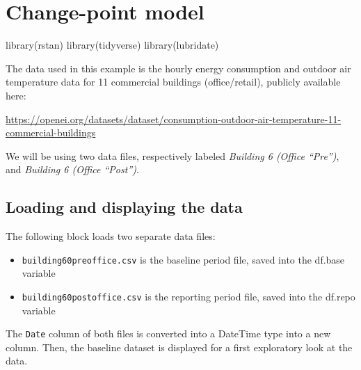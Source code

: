 \documentclass[
]{article}
\newenvironment{Shaded}{\begin{snugshade}}{\end{snugshade}}
\newcommand{\FunctionTok}[1]{\textcolor[rgb]{0.00,0.00,0.00}{#1}}
\newcommand{\NormalTok}[1]{#1}
\providecommand{\tightlist}{%
  \setlength{\itemsep}{0pt}\setlength{\parskip}{0pt}}
\begin{document}
\hypertarget{change-point-model}{%
\section{Change-point model}\label{change-point-model}}

\begin{Shaded}
\begin{Highlighting}[]
\FunctionTok{library}\NormalTok{(rstan)}
\FunctionTok{library}\NormalTok{(tidyverse)}
\FunctionTok{library}\NormalTok{(lubridate)}
\end{Highlighting}
\end{Shaded}

The data used in this example is the hourly energy consumption and outdoor air temperature data for 11 commercial buildings (office/retail), publicly available here:

\url{https://openei.org/datasets/dataset/consumption-outdoor-air-temperature-11-commercial-buildings}

We will be using two data files, respectively labeled \emph{Building 6 (Office ``Pre'')}, and \emph{Building 6 (Office ``Post'')}.

\hypertarget{loading-and-displaying-the-data}{%
\subsection{Loading and displaying the data}\label{loading-and-displaying-the-data}}

The following block loads two separate data files:

\begin{itemize}
\tightlist
\item
  \texttt{building60preoffice.csv} is the baseline period file, saved into the df.base variable
\item
  \texttt{building60postoffice.csv} is the reporting period file, saved into the df.repo variable
\end{itemize}

The \texttt{Date} column of both files is converted into a DateTime type into a new column. Then, the baseline dataset is displayed for a first exploratory look at the data.
\end{document}
